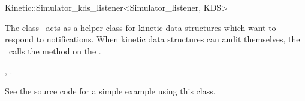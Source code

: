

\begin{ccRefClass}{Kinetic::Simulator_kds_listener<Simulator_listener, KDS>}  %


\ccDefinition
  
The class \ccRefName\ acts as a helper class for kinetic data
structures which want to respond to
 notifications. When kinetic
data structures can audit themselves, the \ccRefName\ calls the
 method on the .



\ccCreation
{}  %


\ccSeeAlso

,
.

\ccExample

See the  source code for a simple
example using this class.


\end{ccRefClass}


